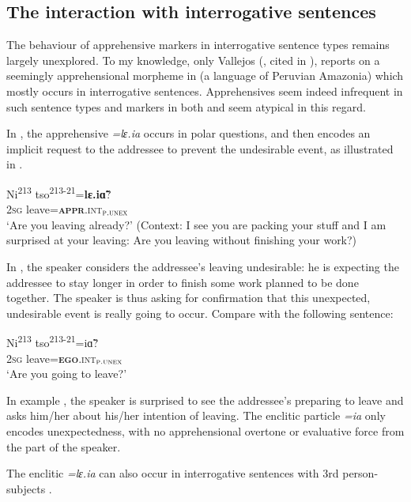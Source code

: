 \documentclass[output=paper,colorlinks,citecolor=brown, language=chinese]{langscibook}
\begin{document}
\subsection{The interaction with interrogative sentences}
\label{subsec:interrogative}

The behaviour of apprehensive markers in interrogative sentence types remains largely unexplored. To my knowledge, only Vallejos (\citeyear[Chapter 12]{Vallejos2016}, cited in \citealt{vuillermet2018a}), reports on a seemingly apprehensional morpheme in  (a  language of Peruvian Amazonia) which mostly occurs in interrogative sentences. Apprehensives seem indeed infrequent in such sentence types and markers in both  and  seem atypical in this regard. 

In , the apprehensive \textit{=lɛ.ia} occurs in polar questions, and then encodes an implicit request to the addressee to prevent the undesirable event, as illustrated in .

\ea\label{ex:Song41}
\gll Ni\textsuperscript{213} tso\textsuperscript{213-21}=\textbf{lɛ.i\~ɑ}? \\
\textsc{2sg} leave=\textsc{\textbf{appr}.int$_{\textsc{p.unex}}$} \\
\glt `Are you leaving already?' (Context: I see you are packing your stuff and I am surprised at your leaving: Are you leaving without finishing your work?)
\z

\noindent In , the  speaker considers the addressee's leaving undesirable: he is expecting the addressee to stay longer in order to finish some work planned to be done together. The speaker is thus asking for confirmation that this unexpected, undesirable event is really going to occur. Compare with the following sentence:


\ea\label{ex:Song42}
\gll Ni\textsuperscript{213} tso\textsuperscript{213-21}=i\~ɑ? \\
\textsc{2sg} leave=\textsc{\textbf{ego}.int$_{\textsc{p.unex}}$} \\
\glt `Are you going to leave?'
\z

\noindent In example , the speaker is surprised to see the addressee's preparing to leave and asks him/her about his/her intention of leaving. The enclitic particle \textit{=ia} only encodes unexpectedness, with no apprehensional overtone or evaluative force from the part of the speaker. 

The enclitic \textit{=lɛ.ia} can also occur in interrogative sentences with 3rd person-subjects .
\end{document}
